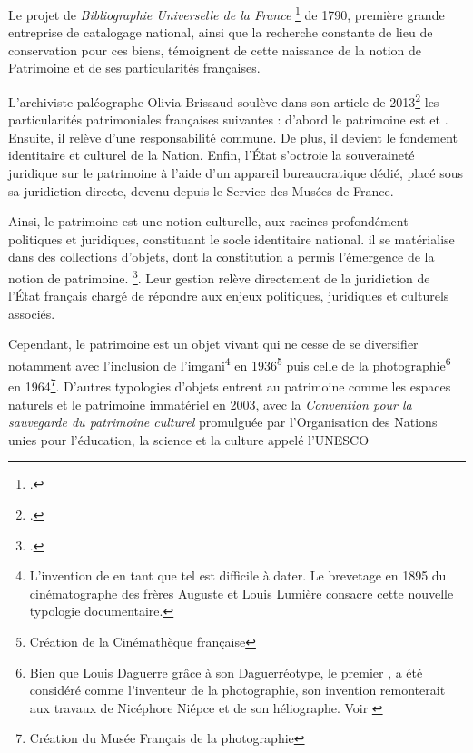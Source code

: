 Le projet de \textit{Bibliographie Universelle de la France} \footcite{mellotConfiscationsRevolutionnairesHistoire2019} de 1790, première grande entreprise de catalogage national, ainsi que la recherche constante de lieu de conservation pour ces biens, témoignent de cette naissance de la notion de Patrimoine et de ses particularités françaises. 
		 
L'archiviste paléographe Olivia Brissaud soulève dans son article de 2013\footcite{brissaudLelaborationPrincipeDinalienabilite2013/dec./10} les particularités patrimoniales françaises suivantes : d'abord le patrimoine est  et . Ensuite, il relève d'une responsabilité commune. De plus, il devient le fondement identitaire et culturel de la Nation. Enfin, l'État s'octroie la souveraineté juridique sur le patrimoine à l'aide d'un appareil bureaucratique dédié, placé sous sa juridiction directe, devenu depuis le Service des Musées de France.
		
Ainsi, le patrimoine est une notion culturelle, aux racines profondément politiques et juridiques, constituant le socle identitaire national. il se matérialise dans des collections d'objets, dont la constitution a permis l'émergence de la notion de patrimoine.  \footcite[p.17]{ministeredelacultureGuideGestionDocuments2021}. Leur gestion relève directement de la juridiction de l'État français chargé de répondre aux enjeux politiques, juridiques et culturels associés.\newline
		
Cependant, le patrimoine est un objet vivant qui ne cesse de se diversifier notamment avec l'inclusion de l'\gls{imgani}\footnote{L'invention de  en tant que tel est difficile à dater. Le brevetage en 1895 du cinématographe des frères Auguste et Louis Lumière consacre cette nouvelle typologie documentaire.} en 1936\footnote{Création de la Cinémathèque française} puis celle de la photographie\footnote{Bien que Louis Daguerre grâce à son Daguerréotype, le premier , a été considéré comme l'inventeur de la photographie, son invention remonterait aux travaux de Nicéphore Niépce et de son héliographe. Voir \cite{willfriedbaatzPhotography1997}} en 1964\footnote{Création du Musée Français de la photographie}. D'autres typologies d'objets entrent au patrimoine comme les espaces naturels et le patrimoine immatériel en 2003, avec la \textit{Convention pour la sauvegarde du patrimoine culturel} promulguée par l'Organisation des Nations unies pour l'éducation, la science et la culture appelé l'\gls{UNESCO}
		
